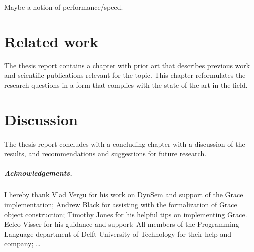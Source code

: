 \documentclass[a4paper,UKenglish]{lipics-v2016}
\begin{document}
Maybe a notion of performance/speed.

\section{Related work}
The thesis report contains a chapter with prior art that describes previous work and scientific publications relevant for the topic. This chapter reformulates the research questions in a form that complies with the state of the art in the field.

\section{Discussion}
The thesis report concludes with a concluding chapter with a discussion of the results, and recommendations and suggestions for future research.



\subparagraph*{Acknowledgements.}

I hereby thank Vlad Vergu for his work on DynSem and support of the Grace implementation; Andrew Black for assisting with the formalization of Grace object construction; Timothy Jones for his helpful tips on implementing Grace. Eelco Visser for his guidance and support; All members of the Programming Language department of Delft University of Technology for their help and company; \dots

\appendix



\end{document}
